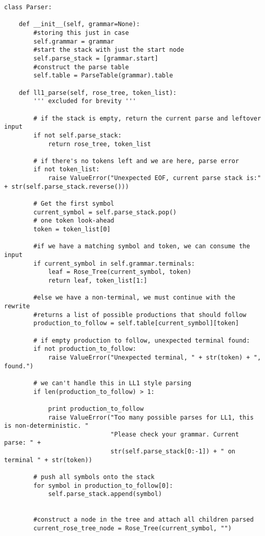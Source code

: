 \documentclass{article}
\begin{document}
\begin{verbatim}
class Parser:

    def __init__(self, grammar=None):
        #storing this just in case
        self.grammar = grammar
        #start the stack with just the start node
        self.parse_stack = [grammar.start]
        #construct the parse table
        self.table = ParseTable(grammar).table

    def ll1_parse(self, rose_tree, token_list):
        ''' excluded for brevity '''

        # if the stack is empty, return the current parse and leftover input
        if not self.parse_stack:
            return rose_tree, token_list

        # if there's no tokens left and we are here, parse error
        if not token_list:
            raise ValueError("Unexpected EOF, current parse stack is:" + str(self.parse_stack.reverse()))

        # Get the first symbol
        current_symbol = self.parse_stack.pop()
        # one token look-ahead
        token = token_list[0]

        #if we have a matching symbol and token, we can consume the input
        if current_symbol in self.grammar.terminals:
            leaf = Rose_Tree(current_symbol, token)
            return leaf, token_list[1:]

        #else we have a non-terminal, we must continue with the rewrite
        #returns a list of possible productions that should follow
        production_to_follow = self.table[current_symbol][token]

        # if empty production to follow, unexpected terminal found:
        if not production_to_follow:
            raise ValueError("Unexpected terminal, " + str(token) + ", found.")

        # we can't handle this in LL1 style parsing
        if len(production_to_follow) > 1:

            print production_to_follow
            raise ValueError("Too many possible parses for LL1, this is non-deterministic. "
                             "Please check your grammar. Current parse: " +
                             str(self.parse_stack[0:-1]) + " on terminal " + str(token))

        # push all symbols onto the stack
        for symbol in production_to_follow[0]:
            self.parse_stack.append(symbol)


        #construct a node in the tree and attach all children parsed
        current_rose_tree_node = Rose_Tree(current_symbol, "")


\end{verbatim}
\end{document}
